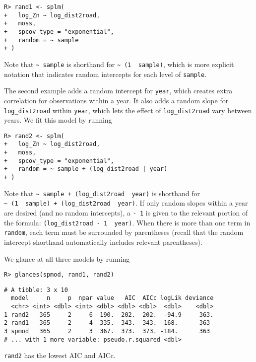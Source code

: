 \documentclass[10pt,letterpaper]{article}
\begin{document}
\begin{verbatim}
R> rand1 <- splm(
+   log_Zn ~ log_dist2road,
+   moss,
+   spcov_type = "exponential",
+   random = ~ sample
+ )
\end{verbatim}

Note that \texttt{\textasciitilde{}\ sample} is shorthand for
\texttt{\textasciitilde{}\ (1\ \textbar{}\ sample)}, which is more
explicit notation that indicates random intercepts for each level of
\texttt{sample}.

The second example adds a random intercept for \texttt{year}, which
creates extra correlation for observations within a year. It also adds a
random slope for \texttt{log\_dist2road} within \texttt{year}, which
lets the effect of \texttt{log\_dist2road} vary between years. We fit
this model by running

\begin{verbatim}
R> rand2 <- splm(
+   log_Zn ~ log_dist2road,
+   moss,
+   spcov_type = "exponential",
+   random = ~ sample + (log_dist2road | year)
+ )
\end{verbatim}

Note that
\texttt{\textasciitilde{}\ sample\ +\ (log\_dist2road\ \textbar{}\ year)}
is shorthand for
\texttt{\textasciitilde{}\ (1\ \textbar{}\ sample)\ +\ (log\_dist2road\ \textbar{}\ year)}.
If only random slopes within a year are desired (and no random
intercepts), a \texttt{-\ 1} is given to the relevant portion of the
formula: \texttt{(log\_dist2road\ -\ 1\ \textbar{}\ year)}. When there
is more than one term in \texttt{random}, each term must be surrounded
by parentheses (recall that the random intercept shorthand automatically
includes relevant parentheses).

We glance at all three models by running

\begin{verbatim}
R> glances(spmod, rand1, rand2)
\end{verbatim}

\begin{verbatim}
# A tibble: 3 x 10
  model     n     p  npar value   AIC  AICc logLik deviance
  <chr> <int> <dbl> <int> <dbl> <dbl> <dbl>  <dbl>    <dbl>
1 rand2   365     2     6  190.  202.  202.  -94.9     363.
2 rand1   365     2     4  335.  343.  343. -168.      363 
3 spmod   365     2     3  367.  373.  373. -184.      363 
# ... with 1 more variable: pseudo.r.squared <dbl>
\end{verbatim}

\texttt{rand2} has the lowest AIC and AICc.
\end{document}
